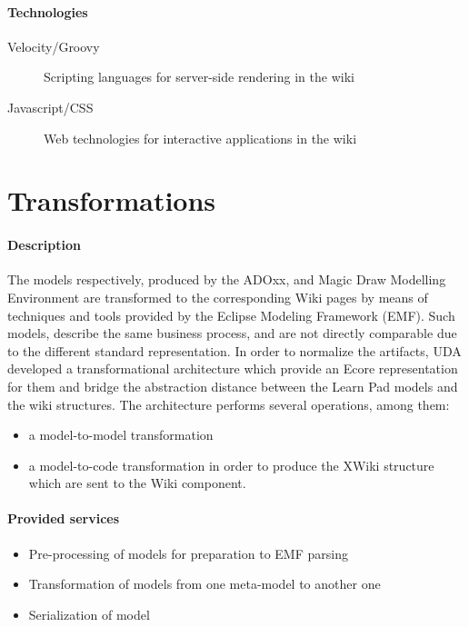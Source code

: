 \documentclass{learnpad}
\begin{document}
\paragraph{Technologies}
\begin{description}
	\item[Velocity/Groovy] Scripting languages for server-side rendering in the wiki
	\item[Javascript/CSS] Web technologies for interactive applications in the wiki
\end{description}

\section{Transformations}\label{sec:transformations}
\paragraph{Description}
The models respectively, produced by the ADOxx, and Magic Draw Modelling
Environment are transformed to the corresponding Wiki pages by means of
techniques and tools provided by the Eclipse Modeling Framework (EMF). Such
models, describe the same business process, and are not directly comparable due
to the different standard representation. In order to normalize the artifacts,
UDA developed a transformational architecture which provide an Ecore
representation for them and bridge the abstraction distance between the Learn
Pad models and the wiki structures. The architecture performs several
operations, among them:
\begin{itemize}
	\item a model-to-model transformation
	\item a model-to-code transformation in order to produce the XWiki structure
		which are sent to the Wiki component.
\end{itemize}

\paragraph{Provided services}
\begin{itemize}
	\item Pre-processing of models for preparation to EMF parsing
	\item Transformation of models from one meta-model to another one
	\item Serialization of model
\end{itemize}
\end{document}
